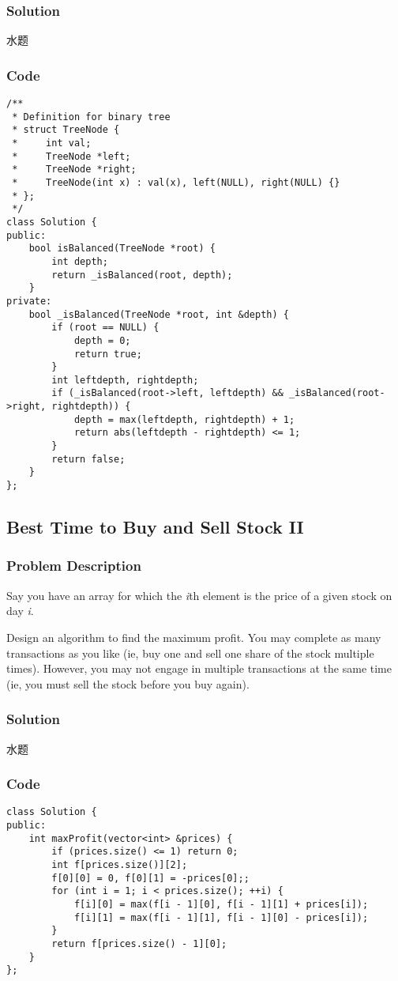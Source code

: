 \documentclass[courier]{article}
\begin{document}
\begin{CJK*}{UTF8}{gkai}
\subsubsection*{Solution}
水题

\subsubsection*{Code}
\begin{lstlisting}
/**
 * Definition for binary tree
 * struct TreeNode {
 *     int val;
 *     TreeNode *left;
 *     TreeNode *right;
 *     TreeNode(int x) : val(x), left(NULL), right(NULL) {}
 * };
 */
class Solution {
public:
    bool isBalanced(TreeNode *root) {
        int depth;
        return _isBalanced(root, depth);
    }
private:
    bool _isBalanced(TreeNode *root, int &depth) {
        if (root == NULL) {
            depth = 0;
            return true;
        }
        int leftdepth, rightdepth;
        if (_isBalanced(root->left, leftdepth) && _isBalanced(root->right, rightdepth)) {
            depth = max(leftdepth, rightdepth) + 1;
            return abs(leftdepth - rightdepth) <= 1;
        }
        return false;
    }
}; 
\end{lstlisting}


\subsection{ Best Time to Buy and Sell Stock II }

\subsubsection*{Problem Description}
Say you have an array for which the \emph{i}th element is the price of a given stock on day \emph{i}.

Design an algorithm to find the maximum profit. You may complete as many transactions as you like (ie, buy one and sell one share of the stock multiple times). However, you may not engage in multiple transactions at the same time (ie, you must sell the stock before you buy again).



\subsubsection*{Solution}
水题

\subsubsection*{Code}
\begin{lstlisting}
class Solution {
public:
    int maxProfit(vector<int> &prices) {
        if (prices.size() <= 1) return 0;
        int f[prices.size()][2];
        f[0][0] = 0, f[0][1] = -prices[0];;
        for (int i = 1; i < prices.size(); ++i) {
            f[i][0] = max(f[i - 1][0], f[i - 1][1] + prices[i]);
            f[i][1] = max(f[i - 1][1], f[i - 1][0] - prices[i]);
        }
        return f[prices.size() - 1][0];
    }
}; 
\end{lstlisting}



\end{CJK*}
\end{document}
